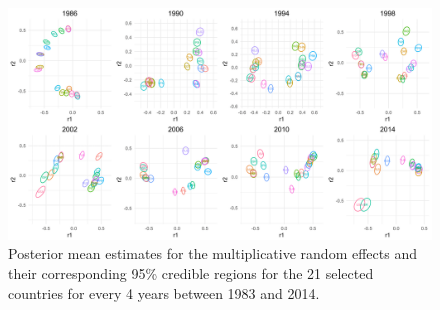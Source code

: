 \documentclass[a4paper]{article}
\begin{document}
  \begin{figure}[ht]
  	\begin{center}  
  		 \includegraphics[width=1\textwidth]{plots_paper/UDU_reduced_8years-1.png}
  	\end{center}
  	\caption {Posterior mean estimates for the multiplicative random effects and their corresponding 95\% credible regions for the 21 selected countries for every 4 years between 1983 and 2014.  }
  	\label{figure:UDplot}
  \end{figure}
  \newpage
\end{document}
